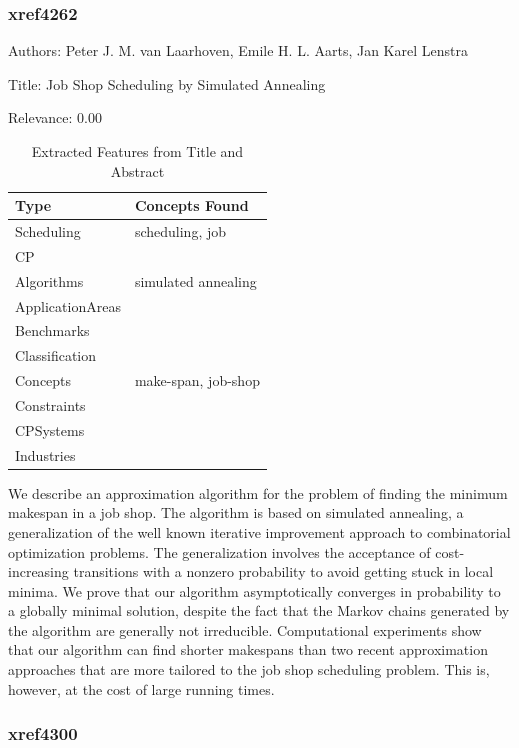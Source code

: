\subsubsection{xref4262}
\label{mw:xref4262}

Authors: Peter J. M. van Laarhoven, Emile H. L. Aarts, Jan Karel Lenstra

Title: Job Shop Scheduling by Simulated Annealing

Relevance:  0.00

{\scriptsize
\begin{longtable}{p{2cm}p{20cm}}
\caption{Extracted Features from Title and Abstract}\\ \toprule
Type & Concepts Found\\ \midrule
\endhead
\bottomrule
\endfoot
Scheduling & scheduling, job\\ 
CP & \\ 
Algorithms & simulated annealing\\ 
ApplicationAreas & \\ 
Benchmarks & \\ 
Classification & \\ 
Concepts & make-span, job-shop\\ 
Constraints & \\ 
CPSystems & \\ 
Industries & \\ 
\end{longtable}
}

  We describe an approximation algorithm for the problem of finding the minimum makespan in a job shop. The algorithm is based on simulated annealing, a generalization of the well known iterative improvement approach to combinatorial optimization problems. The generalization involves the acceptance of cost-increasing transitions with a nonzero probability to avoid getting stuck in local minima. We prove that our algorithm asymptotically converges in probability to a globally minimal solution, despite the fact that the Markov chains generated by the algorithm are generally not irreducible. Computational experiments show that our algorithm can find shorter makespans than two recent approximation approaches that are more tailored to the job shop scheduling problem. This is, however, at the cost of large running times.  

\subsubsection{xref4300}
\label{mw:xref4300}

